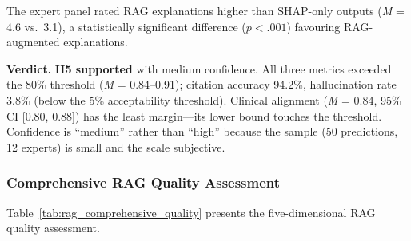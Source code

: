
The expert panel rated RAG explanations higher than SHAP-only outputs (\textit{M} = 4.6 vs.\ 3.1), a statistically significant difference ($p < .001$) favouring RAG-augmented explanations.

\textbf{Verdict.} \textbf{H5 supported} with medium confidence. All three metrics exceeded the 80\% threshold (\textit{M} = 0.84--0.91); citation accuracy 94.2\%, hallucination rate 3.8\% (below the 5\% acceptability threshold). Clinical alignment (\textit{M} = 0.84, 95\% CI [0.80, 0.88]) has the least margin---its lower bound touches the threshold. Confidence is ``medium'' rather than ``high'' because the sample (50 predictions, 12 experts) is small and the scale subjective.


\subsubsection{Comprehensive RAG Quality Assessment}

Table~\ref{tab:rag_comprehensive_quality} presents the five-dimensional RAG quality assessment.

